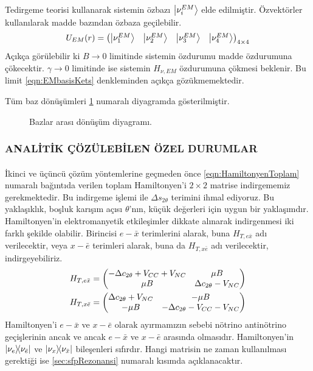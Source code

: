Tedirgeme teorisi kullanarak sistemin özbazı $ \ket{\nu^{EM}_{i}} $ elde edilmiştir. Özvektörler kullanılarak madde bazından özbaza geçilebilir.
\begin{equation} \label{eqn:U_EM_tedirgenmis}
	U_{EM}(r) = \mqty(\ket{\nu^{EM}_{1}} & \ket{\nu^{EM}_{2}} & \ket{\nu^{EM}_{3}} &\ket{\nu^{EM}_{4}})_{4\times4}
\end{equation}
Açıkça görülebilir ki $ B \rightarrow 0 $ limitinde sistemin özdurumu madde özdurumuna çökecektir. $ \gamma \rightarrow 0 $ limitinde ise sistemin $ H_{\nu,EM} $ özdurumuna çökmesi beklenir. Bu limit \eqref{eqn:EMbasisKets} denkleminden açıkça gözükmemektedir.

Tüm baz dönüşümleri \ref{fig:transfDiagram} numaralı diyagramda gösterilmiştir.
\begin{figure}[hbt!]
	\centering
	
	\caption[Bazlar arası dönüşüm diyagramı.]{Bazlar arası dönüşüm diyagramı.}
	\label{fig:transfDiagram}
\end{figure}

\subsubsection{ANALİTİK ÇÖZÜLEBİLEN ÖZEL DURUMLAR}
\paragraph{}
İkinci ve üçüncü çözüm yöntemlerine geçmeden önce \eqref{eqn:HamiltonyenToplam} numaralı bağıntıda verilen toplam Hamiltonyen'i $ 2\times2 $ matrise indirgememiz gerekmektedir. Bu indirgeme işlemi ile $ \Delta s_{2\theta} $ terimini ihmal ediyoruz. Bu yaklaşıklık, boşluk karışım açısı $ \theta $'nın, küçük değerleri için uygun bir yaklaşımdır. Hamiltonyen'in elektromanyetik etkileşimler dikkate alınarak indirgenmesi iki farklı şekilde olabilir. Birincisi $ e-\bar{x} $ terimlerini alarak, buna $ H_{T,e\bar{x}} $ adı verilecektir, veya $ x-\bar{e} $ terimleri alarak, buna da $ H_{T,x\bar{e}} $ adı verilecektir, indirgeyebiliriz.
\begin{align}
	\label{eqn:Hamiltonyen_T14}H_{T,e\bar{x}} &= \mqty(-\Delta c_{2\theta}+V_{CC}+V_{NC} & \mu B \\ \mu B & \Delta c_{2\theta}-V_{NC}) \\
	\label{eqn:Hamiltonyen_T23}H_{T,x\bar{e}} &= \mqty(\Delta c_{2\theta}+V_{NC} & -\mu B \\ -\mu B & -\Delta c_{2\theta}-V_{CC}-V_{NC})
\end{align}
Hamiltonyen'i $ e-\bar{x} $ ve $ x-\bar{e} $ olarak ayırmamızın sebebi nötrino antinötrino geçişlerinin ancak ve ancak $ e-\bar{x} $ ve $ x-\bar{e} $ arasında olmasıdır. Hamiltonyen'in $ \dyad{\nu_{e}}{\nu_{\bar{e}}} $ ve $ \dyad{\nu_{x}}{\nu_{\bar{x}}} $ bileşenleri sıfırdır. Hangi matrisin ne zaman kullanılması gerektiği ise \ref{sec:sfpRezonansi} numaralı kısımda açıklanacaktır.

